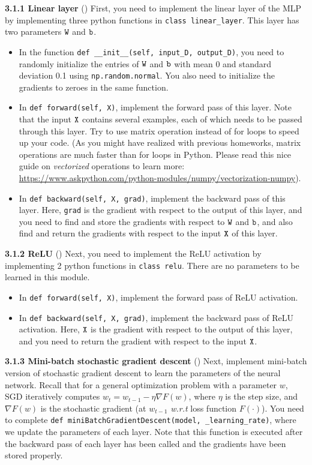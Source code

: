 \textbf{3.1.1 Linear layer} () 
First, you need to implement the linear layer of the MLP by implementing three python functions in \texttt{class linear\_layer}. This layer has two parameters $\verb|W|$ and $\verb|b|$.

\begin{itemize}
    \item In the function \texttt{def \_\_init\_\_(self, input\_D, output\_D)}, you need to randomly initialize the entries of $\verb|W|$ and $\verb|b|$ with mean 0 and standard deviation 0.1 using \texttt{np.random.normal}. You also need to initialize the gradients to zeroes in the same function.
    \item In \texttt{def forward(self, X)}, implement the forward pass of this layer. Note that the input $\verb|X|$ contains several examples, each of which needs to be passed through this layer. Try to use matrix operation instead of for loops to speed up your code. (As you might have realized with previous homeworks, matrix operations are much faster than for loops in Python. Please read this nice guide on \emph{vectorized} operations to learn more: \url{https://www.askpython.com/python-modules/numpy/vectorization-numpy}).
    \item In \texttt{def backward(self, X, grad)}, implement the backward pass of this layer. Here, \verb|grad| is the gradient with respect to the output of this layer, and you need to find and store the gradients with respect to $\verb|W|$ and $\verb|b|$, and also find and return the gradients with respect to the input $\verb|X|$ of this layer.
\end{itemize}

\textbf{3.1.2 ReLU} ()
Next, you need to implement the ReLU activation by implementing 2 python functions in \texttt{class relu}. There are no parameters to be learned in this module. 

\begin{itemize}
    \item In \texttt{def forward(self, X)}, implement the forward pass of ReLU activation.
    \item In \texttt{def backward(self, X, grad)}, implement the backward pass of ReLU activation. Here, $\verb|X|$ is the gradient with respect to the output of this layer, and you need to return the gradient with respect to the input $\verb|X|$.
\end{itemize}

\textbf{3.1.3 Mini-batch stochastic gradient descent} () 
Next, implement mini-batch version of stochastic gradient descent to learn the parameters of the neural network. Recall that for a general optimization problem with a parameter $w$, SGD iteratively computes
$w_t = w_{t-1} - \eta \nabla F(w)$, where $\eta$ is the step size, and $\nabla F(w)$ is the stochastic gradient (at $w_{t-1}$ \textit{w.r.t} loss function $F(\cdot)$). You need to complete \texttt{def miniBatchGradientDescent(model, \_learning\_rate)}, where we update the parameters of each layer. Note that this function is executed after the backward pass of each layer has been called and the gradients have been stored properly.\\

